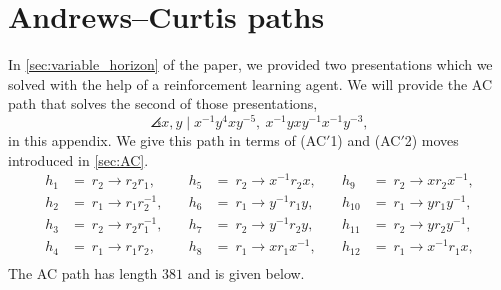 
\section{Andrews--Curtis paths} \label{app:paths}
In \cref{sec:variable_horizon} of the paper, we provided two presentations which we solved with the help of a reinforcement learning agent. We will provide the AC path that solves the second of those presentations, 
\[
\angles{x, y \mid x^{-1} y^4 x y^{-5} , \ x^{-1} y x y^{-1} x^{-1} y^{-3}},
\]
in this appendix. We give this path in terms of (AC$'$1) and (AC$'$2) moves introduced in \cref{sec:AC}. 
\[
\begin{aligned}
h_1 &= \ r_2 \rightarrow r_2 r_1, & \quad h_5 &= \ r_2 \rightarrow x^{-1} r_2 x, & \quad h_9 &= \ r_2 \rightarrow x r_2 x^{-1}, \\
h_2 &= \ r_1 \rightarrow r_1 r_2^{-1}, & \quad h_6 &= \ r_1 \rightarrow y^{-1} r_1 y, & \quad h_{10} &= \ r_1 \rightarrow y r_1 y^{-1}, \\
h_3 &= \ r_2 \rightarrow r_2 r_1^{-1}, & \quad h_7 &= \ r_2 \rightarrow y^{-1} r_2 y, & \quad h_{11} &= \ r_2 \rightarrow y r_2 y^{-1}, \\
h_4 &= \ r_1 \rightarrow r_1 r_2, & \quad h_8 &= \ r_1 \rightarrow x r_1 x^{-1}, & \quad h_{12} &= \ r_1 \rightarrow x^{-1} r_1 x, \\
\end{aligned}
\]
The AC path has length $381$ and is given below.

